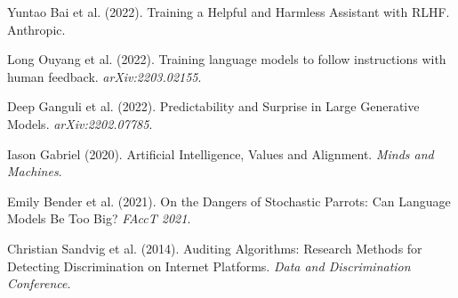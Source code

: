 \documentclass[11pt]{article}
\begin{document}

\begin{thebibliography}{}

Yuntao Bai et al. (2022). Training a Helpful and Harmless Assistant with RLHF. Anthropic.

Long Ouyang et al. (2022). Training language models to follow instructions with human feedback. \emph{arXiv:2203.02155}.

Deep Ganguli et al. (2022). Predictability and Surprise in Large Generative Models. \emph{arXiv:2202.07785}.

Iason Gabriel (2020). Artificial Intelligence, Values and Alignment. \emph{Minds and Machines}.

Emily Bender et al. (2021). On the Dangers of Stochastic Parrots: Can Language Models Be Too Big? \emph{FAccT 2021}.

Christian Sandvig et al. (2014). Auditing Algorithms: Research Methods for Detecting Discrimination on Internet Platforms. \emph{Data and Discrimination Conference}.

\end{thebibliography}
\end{document}
